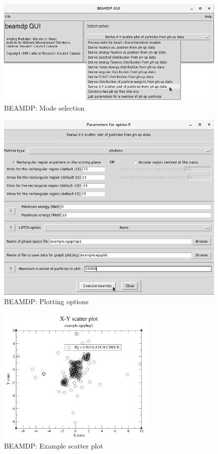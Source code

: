 \documentclass[12pt,twoside]{article}
\begin{document}
\begin{figure}
\begin{center}
\includegraphics[width=5in]{figures/beamdp_step1}
\caption{BEAMDP: Mode selection}
\label{fig:beamdp_step1}
\end{center}
\end{figure}

\begin{figure}
\begin{center}
\includegraphics[width=5in]{figures/beamdp_step2}
\caption{BEAMDP: Plotting options}
\label{fig:beamdp_step2}
\end{center}
\end{figure}

\begin{figure}
\begin{center}
\includegraphics[width=3in]{figures/beamdp_step3}
\caption{BEAMDP: Example scatter plot}
\label{fig:beamdp_step3}
\end{center}
\end{figure}
\end{document}
